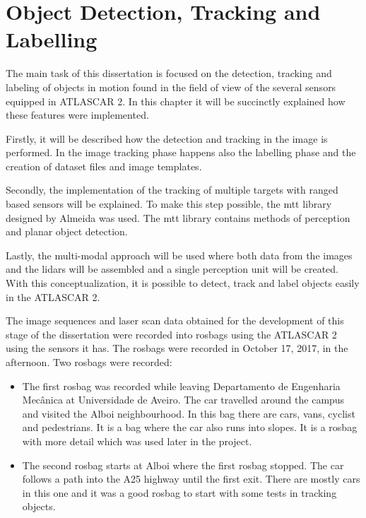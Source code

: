 \chapter{Object Detection, Tracking and Labelling}

The main task of this dissertation is focused on the detection, tracking and labeling of objects in motion found in the field of view of the several sensors equipped in ATLASCAR 2. In this chapter it will be succinctly explained how these features were implemented. 

Firstly, it will be described how the detection and tracking in the image is performed. In the image tracking phase happens also the labelling phase and the creation of dataset files and image templates. 

Secondly, the implementation of the tracking of multiple targets with ranged based sensors will be explained. To make this step possible, the \gls{mtt} library designed by Almeida \cite{SoaresDeAlmeida2016a} was used. The \gls{mtt} library contains methods of perception and planar object detection. 

Lastly, the multi-modal approach will be used where both data from the images and the \gls{lidar}s will be assembled and a single perception unit will be created. With this conceptualization, it is possible to detect, track and label objects easily in the ATLASCAR 2.

The image sequences and laser scan data obtained for the development of this stage of the dissertation were recorded into rosbags using the ATLASCAR 2 using the sensors it has. The rosbags were recorded in October 17, 2017, in the afternoon. Two rosbags were recorded:

\begin{itemize}
	\item The first rosbag was recorded while leaving Departamento de Engenharia Mec\^anica at Universidade de Aveiro. The car travelled around the campus and visited the Alboi neighbourhood.
	\subitem In this bag there are cars, vans, cyclist and pedestrians. It is a bag where the car also runs into slopes. It is a rosbag with more detail which was used later in the project.
	\item The second rosbag starts at Alboi where the first rosbag stopped. The car follows a path into the A25 highway until the first exit.
	\subitem There are mostly cars in this one and it was a good rosbag to start with some tests in tracking objects.
\end{itemize} 

